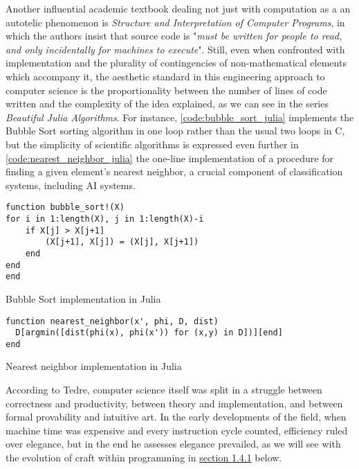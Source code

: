Another influential academic textbook dealing not just with computation as a an autotelic phenomenon is \emph{Structure and Interpretation of Computer Programs}, in which the authors insist that source code is "\emph{must be written for people to read, and only incidentally for machines to execute}"\cite{abelson_structure_1979}. Still, even when confronted with implementation and the plurality of contingencies of non-mathematical elements which accompany it, the aesthetic standard in this engineering approach to computer science is the proportionality between the number of lines of code written and the complexity of the idea explained, as we can see in the series \emph{Beautiful Julia Algorithms}\cite{moss_beautifulalgorithms_2022}. For instance, \ref{code:bubble_sort_julia} implements the Bubble Sort sorting algorithm in one loop rather than the usual two loops in C, but the simplicity of scientific algorithms is expressed even further in \ref{code:nearest_neighbor_julia} the one-line implementation of a procedure for finding a given element's nearest neighbor, a crucial component of classification systems, including AI systems.

\begin{listing}
  \begin{verbatim}
function bubble_sort!(X)
for i in 1:length(X), j in 1:length(X)-i
    if X[j] > X[j+1]
        (X[j+1], X[j]) = (X[j], X[j+1])
    end
end
end
\end{verbatim}
  \caption{Bubble Sort implementation in Julia}
  \label{code:bubble_sort_julia}
\end{listing}

\begin{listing}
  \begin{verbatim}
function nearest_neighbor(x', phi, D, dist)
  D[argmin([dist(phi(x), phi(x')) for (x,y) in D])][end]
end
\end{verbatim}
  \caption{Nearest neighbor implementation in Julia}
  \label{code:nearest_neighbor_julia}
\end{listing}

According to Tedre, computer science itself was split in a struggle between correctness and productivity, between theory and implementation, and between formal provability and intuitive art. In the early developments of the field, when machine time was expensive and every instruction cycle counted, efficiency ruled over elegance, but in the end he assesses elegance prevailed, as we will see with the evolution of craft within programming in \hyperref[sec:craft]{section 1.4.1} below.

